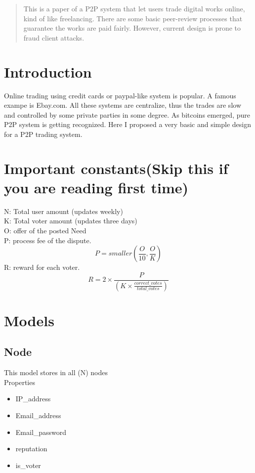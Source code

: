 \documentclass[12pt]{article}
\begin{document}
\maketitle

\begin{abstract}
This is a paper of a P2P system that let users trade digital works online, kind of like freelancing. There are some basic peer-review processes that guarantee the works are paid fairly. However, current design is prone to fraud client attacks.
\end{abstract}

\section{Introduction}
Online trading using credit cards or paypal-like system is popular. A famous exampe is Ebay.com. All these systems are centralize, thus the trades are slow and controlled by some private parties in some degree. As bitcoins emerged, pure P2P system is getting recognized. Here I proposed a very basic and simple design for a P2P trading system. 

\section{Important constants(Skip this if you are reading first time)}
N: Total user amount (updates weekly)\\
K: Total voter amount (updates three days)\\
O: offer of the posted Need\\
P: process fee of the dispute. 
\[
P = smaller(\frac{O}{10}, \frac{O}{K})
\]
R: reward for each voter. 
\[
R = 2 \times \frac{P}{(K \times \frac{correct\_votes}{total\_votes})}
\]

\section{Models}

\subsection{Node}
This model stores in all (N) nodes\\
Properties
\begin{itemize}
	\item IP\_address
	\item Email\_address
	\item Email\_password
	\item reputation
	\item is\_voter
\end{itemize}
\end{document}
